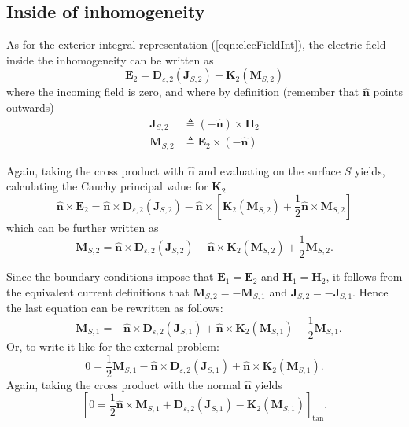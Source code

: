 \documentclass[a4paper,10pt]{book}
\newcommand{\field}[1]{\mathbf{#1}}
\newcommand{\current}[1]{\mathbf{#1}}
\newcommand{\vect}[1]{\mathbf{#1}}
\newcommand{\operator}[1]{\mathbf{#1}}
\begin{document}
\subsection{Inside of inhomogeneity}
%
\par
As for the exterior integral representation (\ref{eqn:elecFieldInt}), the electric field inside the inhomogeneity can be written as
\begin{equation}
\field{E}_2 = \operator{D}_{\varepsilon, 2}\left(\current{J}_{S,2}\right) - \operator{K}_{2}\left(\current{M}_{S,2}\right)
\end{equation}
where the incoming field is zero, and where by definition (remember that $\vect{\hat{n}}$ points outwards)
\begin{align}
\current{J}_{S,2} &\triangleq (-\vect{\hat{n}}) \times \field{H}_2 \\
\current{M}_{S,2} &\triangleq \field{E}_2 \times (-\vect{\hat{n}}) 
\end{align}
%
\par
Again, taking the cross product with $\vect{\hat{n}}$ and evaluating on the surface $S$ yields, calculating the Cauchy principal value for $\operator{K}_2$
\begin{equation}
\vect{\hat{n}} \times \field{E}_2 = \vect{\hat{n}} \times \operator{D}_{\varepsilon, 2}\left(\current{J}_{S,2}\right) - \vect{\hat{n}} \times \left[\operator{K}_{2}\left(\current{M}_{S,2}\right)+ \frac{1}{2}\vect{\hat{n}} \times \current{M}_{S,2} \right]
\end{equation}
which can be further written as
\begin{equation}
\current{M}_{S,2} = \vect{\hat{n}} \times \operator{D}_{\varepsilon, 2}\left(\current{J}_{S,2}\right) - \vect{\hat{n}} \times \operator{K}_{2}\left(\current{M}_{S,2}\right)+ \frac{1}{2} \current{M}_{S,2}.
\end{equation}
%
\par
Since the boundary conditions impose that $\field{E}_1 = \field{E}_2$ and $\field{H}_1 = \field{H}_2$, it follows from the equivalent current definitions that $\current{M}_{S,2} = -\current{M}_{S,1}$ and $\current{J}_{S,2} = -\current{J}_{S,1}$. Hence the last equation can be rewritten as follows:
\begin{equation}
-\current{M}_{S,1} = -\vect{\hat{n}} \times \operator{D}_{\varepsilon, 2}\left(\current{J}_{S,1}\right) + \vect{\hat{n}} \times \operator{K}_{2}\left(\current{M}_{S,1}\right)- \frac{1}{2} \current{M}_{S,1}.
\end{equation}
Or, to write it like for the external problem:
\begin{equation}
0 = \frac{1}{2} \current{M}_{S,1} -\vect{\hat{n}} \times \operator{D}_{\varepsilon, 2}\left(\current{J}_{S,1}\right) + \vect{\hat{n}} \times \operator{K}_{2}\left(\current{M}_{S,1}\right).
\end{equation}
Again, taking the cross product with the normal $\vect{\hat{n}}$ yields
\begin{equation}
\boxed{
\left[ 0 =  \frac{1}{2}\vect{\hat{n}}\times \current{M}_{S,1} + \operator{D}_{\varepsilon, 2}\left(\current{J}_{S,1}\right) - \operator{K}_{2}\left(\current{M}_{S,1}\right) \right]_\text{tan} }.
\end{equation}
\end{document}
